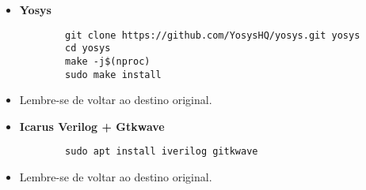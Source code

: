\documentclass{article}
\begin{document}
\begin{itemize}
    \item {\textbf{Yosys}}
    \textnormal{}
    \begin{verbatim}
        git clone https://github.com/YosysHQ/yosys.git yosys
        cd yosys
        make -j$(nproc)
        sudo make install
        \end{verbatim}
        
        \item Lembre-se de voltar ao destino original.
        \vspace{08pt}
        
    \item {\textbf{Icarus Verilog + Gtkwave}}
    \textnormal{}
    \begin{verbatim}
        sudo apt install iverilog gitkwave
        \end{verbatim}
        
        \item Lembre-se de voltar ao destino original.
        \vspace{08pt}
        
\end{itemize}
\end{document}
